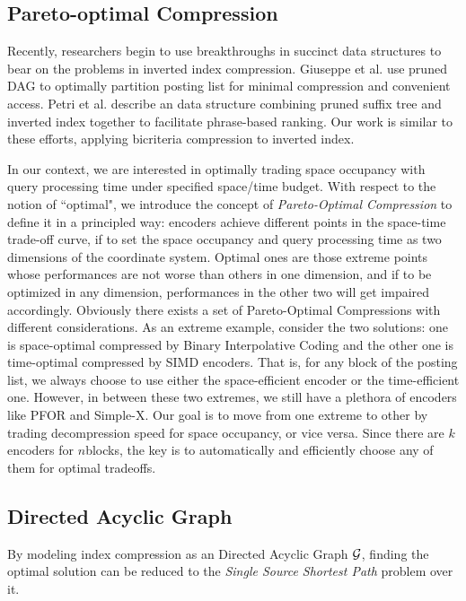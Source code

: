\documentclass{sig-alternate-05-2015}
\begin{document}
\subsection{Pareto-optimal Compression}
Recently, researchers begin to use breakthroughs in succinct data structures to bear on the problems in inverted index compression.
Giuseppe et al. \cite{ottaviano2014partitioned} use pruned DAG \cite{ferragina2011optimally} to optimally partition posting list for minimal compression and convenient access.
Petri et al. \cite{petri2014score} describe an data structure combining pruned suffix tree and inverted index together to facilitate phrase-based ranking.
Our work is similar to these efforts, applying bicriteria compression to inverted index.

In our context, we are interested in optimally trading space occupancy with query processing time under specified space/time budget.
With respect to the notion of ``optimal", we introduce the concept of \textit{Pareto-Optimal Compression} to define it in a principled way: encoders achieve different points in the space-time trade-off curve, if to set the space occupancy and query processing time as two dimensions of the coordinate system.
Optimal ones are those extreme points whose performances are not worse than others in one dimension, and if to be optimized in any dimension, performances in the other two will get impaired accordingly.
Obviously there exists a set of Pareto-Optimal Compressions with different considerations.
As an extreme example, consider the two solutions: one is space-optimal compressed by Binary Interpolative Coding \cite{moffat2000binary} and the other one is time-optimal compressed by SIMD encoders.
That is, for any block of the posting list, we always choose to use either the space-efficient encoder or the time-efficient one.
However, in between these two extremes, we still have a plethora of encoders like PFOR and Simple-X.
Our goal is to move from one extreme to other by trading decompression speed for space occupancy, or vice versa.
Since there are $ k $ encoders for $ n $blocks, the key is to automatically and efficiently choose any of them for optimal tradeoffs.

\subsection{Directed Acyclic Graph}
By modeling index compression as an Directed Acyclic Graph $ \cal G $, finding the optimal solution can be reduced to the \textit{Single Source Shortest Path} problem over it.
\end{document}
